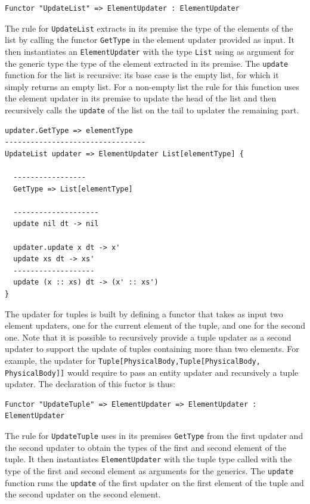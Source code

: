 \begin{lstlisting}
Functor "UpdateList" => ElementUpdater : ElementUpdater
\end{lstlisting}

\noindent
The rule for \texttt{UpdateList} extracts in its premise the type of the elements of the list by calling the functor \texttt{GetType} in the element updater provided as input. It then instantiates an \texttt{ElementUpdater} with the type \texttt{List} using as argument for the generic type the type of the element extracted in its premise. The \texttt{update} function for the list is recursive: its base case is the empty list, for which it simply returns an empty list. For a non-empty list the rule for this function uses the element updater in its premise to update the head of the list and then recursively calls the \texttt{update} of the list on the tail to updater the remaining part.

\begin{lstlisting}
updater.GetType => elementType
---------------------------------
UpdateList updater => ElementUpdater List[elementType] {

  -----------------
  GetType => List[elementType]

  --------------------
  update nil dt -> nil

  updater.update x dt -> x'
  update xs dt -> xs'
  -------------------
  update (x :: xs) dt -> (x' :: xs')
}
\end{lstlisting}

\noindent
The updater for tuples is built by defining a functor that takes as input two element updaters, one for the current element of the tuple, and one for the second one. Note that it is possible to recursively provide a tuple updater as a second updater to support the update of tuples containing more than two elements. For example, the updater for \texttt{Tuple[PhysicalBody,Tuple[PhysicalBody,\\PhysicalBody]]} would require to pass an entity updater and recursively a tuple updater. The declaration of this fuctor is thus:

\begin{lstlisting}
Functor "UpdateTuple" => ElementUpdater => ElementUpdater : ElementUpdater
\end{lstlisting}

\noindent
The rule for \texttt{UpdateTuple} uses in its premises \texttt{GetType} from the first updater and the second updater to obtain the types of the first and second element of the tuple. It then instantiates \texttt{ElementUpdater} with the tuple type called with the type of the first and second element as arguments for the generics. The \texttt{update} function runs the \texttt{update} of the first updater on the first element of the tuple and the second updater on the second element.

